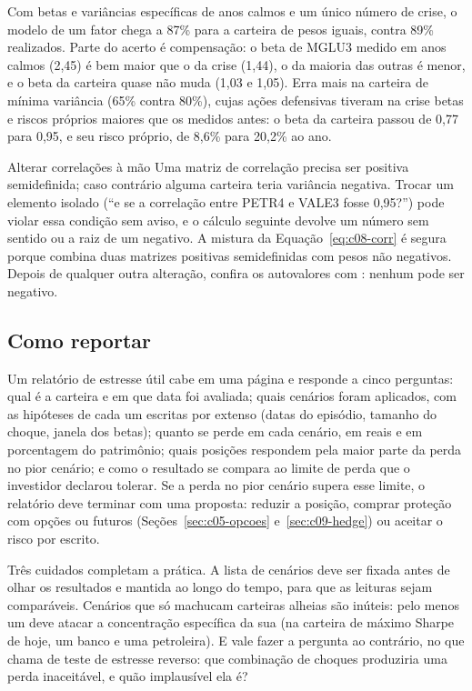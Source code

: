 Com betas e variâncias específicas de anos calmos e um único número de crise, o modelo de um fator chega a 87\% para a carteira de pesos iguais, contra 89\% realizados. Parte do acerto é compensação: o beta de MGLU3 medido em anos calmos (2,45) é bem maior que o da crise (1,44), o da maioria das outras é menor, e o beta da carteira quase não muda (1,03 e 1,05). Erra mais na carteira de mínima variância (65\% contra 80\%), cujas ações defensivas tiveram na crise betas e riscos próprios maiores que os medidos antes: o beta da carteira passou de 0,77 para 0,95, e seu risco próprio, de 8,6\% para 20,2\% ao ano.

\begin{armadilha}{Alterar correlações à mão}
Uma matriz de correlação precisa ser positiva semidefinida; caso contrário alguma carteira teria variância negativa. Trocar um elemento isolado (``e se a correlação entre PETR4 e VALE3 fosse 0,95?'') pode violar essa condição sem aviso, e o cálculo seguinte devolve um número sem sentido ou a raiz de um negativo. A mistura da Equação~\eqref{eq:c08-corr} é segura porque combina duas matrizes positivas semidefinidas com pesos não negativos. Depois de qualquer outra alteração, confira os autovalores com : nenhum pode ser negativo.
\end{armadilha}

\subsection{Como reportar}

Um relatório de estresse útil cabe em uma página e responde a cinco perguntas: qual é a carteira e em que data foi avaliada; quais cenários foram aplicados, com as hipóteses de cada um escritas por extenso (datas do episódio, tamanho do choque, janela dos betas); quanto se perde em cada cenário, em reais e em porcentagem do patrimônio; quais posições respondem pela maior parte da perda no pior cenário; e como o resultado se compara ao limite de perda que o investidor declarou tolerar. Se a perda no pior cenário supera esse limite, o relatório deve terminar com uma proposta: reduzir a posição, comprar proteção com opções ou futuros (Seções~\ref{sec:c05-opcoes} e~\ref{sec:c09-hedge}) ou aceitar o risco por escrito.

Três cuidados completam a prática. A lista de cenários deve ser fixada antes de olhar os resultados e mantida ao longo do tempo, para que as leituras sejam comparáveis. Cenários que só machucam carteiras alheias são inúteis: pelo menos um deve atacar a concentração específica da sua (na carteira de máximo Sharpe de hoje, um banco e uma petroleira). E vale fazer a pergunta ao contrário, no que \citet{hull2018} chama de teste de estresse reverso: que combinação de choques produziria uma perda inaceitável, e quão implausível ela é?

